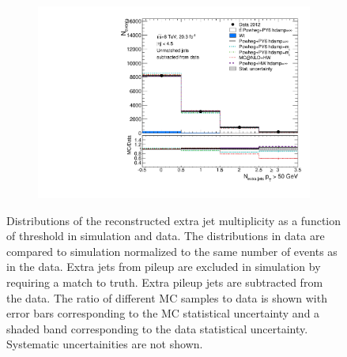 \begin{figure}
\begin{subfigure}[]{0.45\textwidth}
\end{subfigure}
\begin{subfigure}[]{0.45\textwidth}
\includegraphics[width=\textwidth]{fig/MCComp/NLO/NExtraJets50NoPileup.pdf}
\end{subfigure}
\caption{Distributions of the reconstructed extra jet multiplicity as a function of \pt threshold in simulation and data. The distributions in data are compared to \ttbar simulation normalized to the same number of events as in the data. Extra jets from pileup are excluded in simulation by requiring a match to truth. Extra pileup jets are subtracted from the data. The ratio of different MC samples to data is shown with error bars corresponding to the MC statistical uncertainty and a shaded band corresponding to the data statistical uncertainty. Systematic uncertainities are not shown.}
\label{fig:nrecojets}
\end{figure}


